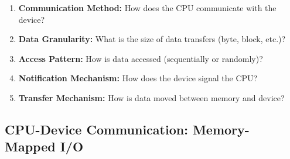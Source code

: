 \documentclass[../../compsys.tex]{subfiles}
\begin{document}
\begin{enumerate}
    \item \textbf{Communication Method:} How does the CPU communicate with the device?
    \item \textbf{Data Granularity:} What is the size of data transfers (byte, block, etc.)?
    \item \textbf{Access Pattern:} How is data accessed (sequentially or randomly)?
    \item \textbf{Notification Mechanism:} How does the device signal the CPU?
    \item \textbf{Transfer Mechanism:} How is data moved between memory and device?
\end{enumerate}

\subsection{CPU-Device Communication: Memory-Mapped I/O}
\end{document}
